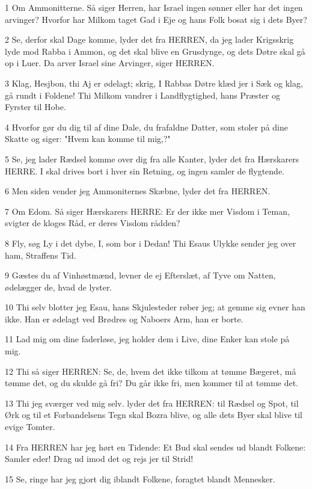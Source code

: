 \par 1 Om Ammonitterne. Så siger Herren, har Israel ingen sønner eller har det ingen arvinger? Hvorfor har Milkom taget Gad i Eje og hans Folk bosat sig i dets Byer?
\par 2 Se, derfor skal Dage komme, lyder det fra HERREN, da jeg lader Krigsskrig lyde mod Rabba i Ammon, og det skal blive en Grusdynge, og dets Døtre skal gå op i Luer. Da arver Israel sine Arvinger, siger HERREN.
\par 3 Klag, Hesjbon, thi Aj er ødelagt; skrig, I Rabbas Døtre klæd jer i Sæk og klag, gå rundt i Foldene! Thi Milkom vandrer i Landflygtighed, hans Præster og Fyrster til Hobe.
\par 4 Hvorfor gør du dig til af dine Dale, du frafaldne Datter, som stoler på dine Skatte og siger: "Hvem kan komme til mig,?"
\par 5 Se, jeg lader Rædsel komme over dig fra alle Kanter, lyder det fra Hærskarers HERRE. I skal drives bort i hver sin Retning, og ingen samler de flygtende.
\par 6 Men siden vender jeg Ammoniternes Skæbne, lyder det fra HERREN.
\par 7 Om Edom. Så siger Hærskarers HERRE: Er der ikke mer Visdom i Teman, svigter de kloges Råd, er deres Visdom rådden?
\par 8 Fly, søg Ly i det dybe, I, som bor i Dedan! Thi Esaus Ulykke sender jeg over ham, Straffens Tid.
\par 9 Gæstes du af Vinhøstmænd, levner de ej Efterslæt, af Tyve om Natten, ødelægger de, hvad de lyster.
\par 10 Thi selv blotter jeg Esau, hans Skjulesteder røber jeg; at gemme sig evner han ikke. Han er ødelagt ved Brødres og Naboers Arm, han er borte.
\par 11 Lad mig om dine faderløse, jeg holder dem i Live, dine Enker kan stole på mig.
\par 12 Thi så siger HERREN: Se, de, hvem det ikke tilkom at tømme Bægeret, må tømme det, og du skulde gå fri? Du går ikke fri, men kommer til at tømme det.
\par 13 Thi jeg sværger ved mig selv. lyder det fra HERREN: til Rædsel og Spot, til Ørk og til et Forbandelsens Tegn skal Bozra blive, og alle dets Byer skal blive til evige Tomter.
\par 14 Fra HERREN har jeg hørt en Tidende: Et Bud skal sendes ud blandt Folkene: Samler eder! Drag ud imod det og rejs jer til Strid!
\par 15 Se, ringe har jeg gjort dig iblandt Folkene, foragtet blandt Mennesker.

